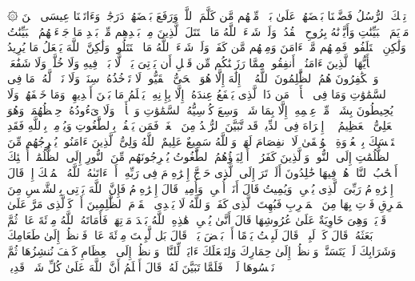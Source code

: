 \stopbuffer%
\startbuffer[\q:2:253]
۞ تِلۡكَ ٱلرُّسُلُ فَضَّلۡنَا بَعۡضَهُمۡ عَلَىٰ بَعۡضࣲۘ مِّنۡهُم مَّن كَلَّمَ ٱللَّهُۖ وَرَفَعَ بَعۡضَهُمۡ دَرَجَٰتࣲۚ وَءَاتَیۡنَا عِیسَى ٱبۡنَ مَرۡیَمَ ٱلۡبَیِّنَٰتِ وَأَیَّدۡنَٰهُ بِرُوحِ ٱلۡقُدُسِۗ وَلَوۡ شَاۤءَ ٱللَّهُ مَا ٱقۡتَتَلَ ٱلَّذِینَ مِنۢ بَعۡدِهِم مِّنۢ بَعۡدِ مَا جَاۤءَتۡهُمُ ٱلۡبَیِّنَٰتُ وَلَٰكِنِ ٱخۡتَلَفُوا۟ فَمِنۡهُم مَّنۡ ءَامَنَ وَمِنۡهُم مَّن كَفَرَۚ وَلَوۡ شَاۤءَ ٱللَّهُ مَا ٱقۡتَتَلُوا۟ وَلَٰكِنَّ ٱللَّهَ یَفۡعَلُ مَا یُرِیدُ%
\stopbuffer%
\startbuffer[\q:2:254]
یَٰۤأَیُّهَا ٱلَّذِینَ ءَامَنُوۤا۟ أَنفِقُوا۟ مِمَّا رَزَقۡنَٰكُم مِّن قَبۡلِ أَن یَأۡتِیَ یَوۡمࣱ لَّا بَیۡعࣱ فِیهِ وَلَا خُلَّةࣱ وَلَا شَفَٰعَةࣱۗ وَٱلۡكَٰفِرُونَ هُمُ ٱلظَّٰلِمُونَ%
\stopbuffer%
\startbuffer[\q:2:255]
ٱللَّهُ لَاۤ إِلَٰهَ إِلَّا هُوَ ٱلۡحَیُّ ٱلۡقَیُّومُۚ لَا تَأۡخُذُهُۥ سِنَةࣱ وَلَا نَوۡمࣱۚ لَّهُۥ مَا فِی ٱلسَّمَٰوَٰتِ وَمَا فِی ٱلۡأَرۡضِۗ مَن ذَا ٱلَّذِی یَشۡفَعُ عِندَهُۥۤ إِلَّا بِإِذۡنِهِۦۚ یَعۡلَمُ مَا بَیۡنَ أَیۡدِیهِمۡ وَمَا خَلۡفَهُمۡۖ وَلَا یُحِیطُونَ بِشَیۡءࣲ مِّنۡ عِلۡمِهِۦۤ إِلَّا بِمَا شَاۤءَۚ وَسِعَ كُرۡسِیُّهُ ٱلسَّمَٰوَٰتِ وَٱلۡأَرۡضَۖ وَلَا یَءُودُهُۥ حِفۡظُهُمَاۚ وَهُوَ ٱلۡعَلِیُّ ٱلۡعَظِیمُ%
\stopbuffer%
\startbuffer[\q:2:256]
لَاۤ إِكۡرَاهَ فِی ٱلدِّینِۖ قَد تَّبَیَّنَ ٱلرُّشۡدُ مِنَ ٱلۡغَیِّۚ فَمَن یَكۡفُرۡ بِٱلطَّٰغُوتِ وَیُؤۡمِنۢ بِٱللَّهِ فَقَدِ ٱسۡتَمۡسَكَ بِٱلۡعُرۡوَةِ ٱلۡوُثۡقَىٰ لَا ٱنفِصَامَ لَهَاۗ وَٱللَّهُ سَمِیعٌ عَلِیمٌ%
\stopbuffer%
\startbuffer[\q:2:257]
ٱللَّهُ وَلِیُّ ٱلَّذِینَ ءَامَنُوا۟ یُخۡرِجُهُم مِّنَ ٱلظُّلُمَٰتِ إِلَى ٱلنُّورِۖ وَٱلَّذِینَ كَفَرُوۤا۟ أَوۡلِیَاۤؤُهُمُ ٱلطَّٰغُوتُ یُخۡرِجُونَهُم مِّنَ ٱلنُّورِ إِلَى ٱلظُّلُمَٰتِۗ أُو۟لَٰۤئِكَ أَصۡحَٰبُ ٱلنَّارِۖ هُمۡ فِیهَا خَٰلِدُونَ%
\stopbuffer%
\startbuffer[\q:2:258]
أَلَمۡ تَرَ إِلَى ٱلَّذِی حَاۤجَّ إِبۡرَٰهِۦمَ فِی رَبِّهِۦۤ أَنۡ ءَاتَىٰهُ ٱللَّهُ ٱلۡمُلۡكَ إِذۡ قَالَ إِبۡرَٰهِۦمُ رَبِّیَ ٱلَّذِی یُحۡیِۦ وَیُمِیتُ قَالَ أَنَا۠ أُحۡیِۦ وَأُمِیتُۖ قَالَ إِبۡرَٰهِۦمُ فَإِنَّ ٱللَّهَ یَأۡتِی بِٱلشَّمۡسِ مِنَ ٱلۡمَشۡرِقِ فَأۡتِ بِهَا مِنَ ٱلۡمَغۡرِبِ فَبُهِتَ ٱلَّذِی كَفَرَۗ وَٱللَّهُ لَا یَهۡدِی ٱلۡقَوۡمَ ٱلظَّٰلِمِینَ%
\stopbuffer%
\startbuffer[\q:2:259]
أَوۡ كَٱلَّذِی مَرَّ عَلَىٰ قَرۡیَةࣲ وَهِیَ خَاوِیَةٌ عَلَىٰ عُرُوشِهَا قَالَ أَنَّىٰ یُحۡیِۦ هَٰذِهِ ٱللَّهُ بَعۡدَ مَوۡتِهَاۖ فَأَمَاتَهُ ٱللَّهُ مِا۟ئَةَ عَامࣲ ثُمَّ بَعَثَهُۥۖ قَالَ كَمۡ لَبِثۡتَۖ قَالَ لَبِثۡتُ یَوۡمًا أَوۡ بَعۡضَ یَوۡمࣲۖ قَالَ بَل لَّبِثۡتَ مِا۟ئَةَ عَامࣲ فَٱنظُرۡ إِلَىٰ طَعَامِكَ وَشَرَابِكَ لَمۡ یَتَسَنَّهۡۖ وَٱنظُرۡ إِلَىٰ حِمَارِكَ وَلِنَجۡعَلَكَ ءَایَةࣰ لِّلنَّاسِۖ وَٱنظُرۡ إِلَى ٱلۡعِظَامِ كَیۡفَ نُنشِزُهَا ثُمَّ نَكۡسُوهَا لَحۡمࣰاۚ فَلَمَّا تَبَیَّنَ لَهُۥ قَالَ أَعۡلَمُ أَنَّ ٱللَّهَ عَلَىٰ كُلِّ شَیۡءࣲ قَدِیرࣱ%

